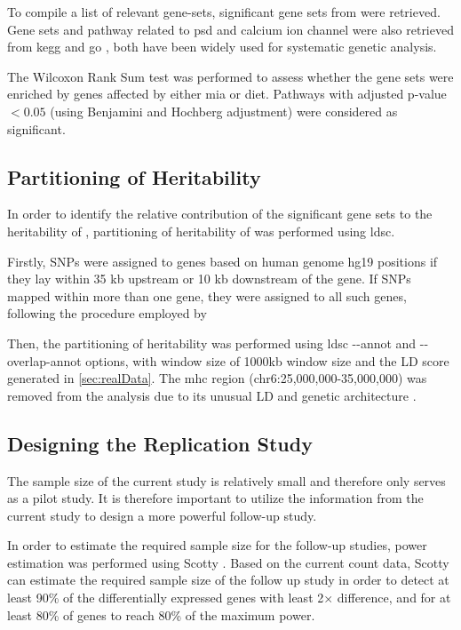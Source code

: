 To compile a list of relevant gene-sets, significant gene sets from \citet{Purcell2014,Consortium2015a} were retrieved.
Gene sets and pathway related to \gls{psd} and calcium ion channel were also retrieved from \gls{kegg} \citep{Kanehisa2000} and \gls{go} \citep{Consortium2015b}, both have been widely used for systematic genetic analysis.

The Wilcoxon Rank Sum test was performed to assess whether the gene sets were enriched by genes affected by either \gls{mia} or diet.
Pathways with adjusted p-value $<0.05$ (using Benjamini and Hochberg adjustment) were considered as significant.

\subsection{Partitioning of Heritability}
In order to identify the relative contribution of the significant gene sets to the heritability of , partitioning of heritability of  was performed using \gls{ldsc}.

Firstly, \glspl{SNP} were assigned to genes based on human genome hg19 positions if they lay within 35 \gls{kb} upstream or 10 \gls{kb} downstream of the gene.
If \glspl{SNP} mapped within more than one gene, they were assigned to all such genes, following the procedure employed by \citet{Consortium2015a}

Then, the partitioning of heritability was performed using \gls{ldsc} \citep{Bulik-Sullivan2015} -{}-annot and -{}-overlap-annot options, with window size of 1000\gls{kb} window size and the \gls{LD} score generated in \cref{sec:realData}.
The \gls{mhc} region (chr6:25,000,000-35,000,000) was removed from the analysis due to its unusual \gls{LD} and genetic architecture \citep{Finucane2015}.

\subsection{Designing the Replication Study}
The sample size of the current study is relatively small and therefore only serves as a pilot study.
It is therefore important to utilize the information from the current study to design a more powerful follow-up study.

In order to estimate the required sample size for the follow-up studies, power estimation was performed using Scotty \citep{Busby2013}.
Based on the current count data, Scotty can estimate the required sample size of the follow up study in order to detect at least 90\% of the differentially expressed genes with least 2$\times$ difference, and for at least 80\% of genes to reach 80\% of the maximum power.

